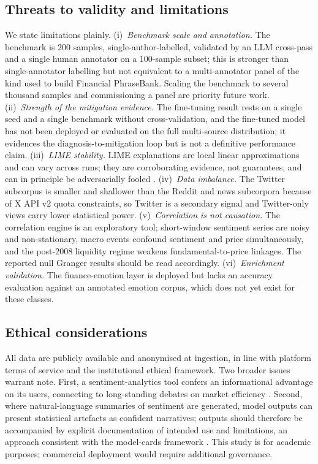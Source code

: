 \documentclass[12pt,a4paper]{article}
\begin{document}
\subsection{Threats to validity and limitations}
We state limitations plainly. (i)~\emph{Benchmark scale and annotation.} The
benchmark is 200 samples, single-author-labelled, validated by an LLM cross-pass and
a single human annotator on a 100-sample subset; this is stronger than
single-annotator labelling but not equivalent to a multi-annotator panel of the kind
used to build Financial PhraseBank. Scaling the benchmark to several thousand samples
and commissioning a panel are priority future work. (ii)~\emph{Strength of the
mitigation evidence.} The fine-tuning result rests on a single seed and a single
benchmark without cross-validation, and the fine-tuned model has not been deployed or
evaluated on the full multi-source distribution; it evidences the
diagnosis-to-mitigation loop but is not a definitive performance claim.
(iii)~\emph{LIME stability.} LIME explanations are local linear approximations and
can vary across runs; they are corroborating evidence, not guarantees, and can in
principle be adversarially fooled \citep{slack2020}. (iv)~\emph{Data imbalance.} The
Twitter subcorpus is smaller and shallower than the Reddit and news subcorpora
because of X API v2 quota constraints, so Twitter is a secondary signal and
Twitter-only views carry lower statistical power. (v)~\emph{Correlation is not
causation.} The correlation engine is an exploratory tool; short-window sentiment
series are noisy and non-stationary, macro events confound sentiment and price
simultaneously, and the post-2008 liquidity regime weakens fundamental-to-price
linkages. The reported null Granger results should be read accordingly.
(vi)~\emph{Enrichment validation.} The finance-emotion layer is deployed but lacks an
accuracy evaluation against an annotated emotion corpus, which does not yet exist for
these classes.

\subsection{Ethical considerations}
All data are publicly available and anonymised at ingestion, in line with platform
terms of service and the institutional ethical framework. Two broader issues warrant
note. First, a sentiment-analytics tool confers an informational advantage on its
users, connecting to long-standing debates on market efficiency \citep{fama1970}.
Second, where natural-language summaries of sentiment are generated, model outputs
can present statistical artefacts as confident narratives; outputs should therefore
be accompanied by explicit documentation of intended use and limitations, an approach
consistent with the model-cards framework \citep{mitchell2019}. This study is for
academic purposes; commercial deployment would require additional governance.
\end{document}
